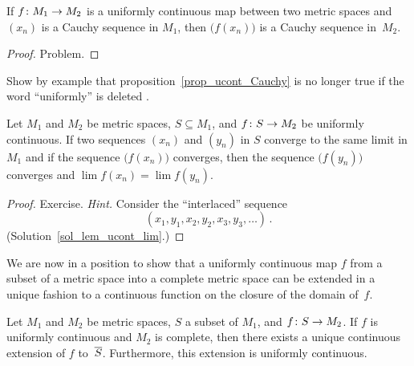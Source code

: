 \begin{prop}\label{prop_ucont_Cauchy}  If $f \colon M_1 \rightarrow M_2$ is a uniformly continuous map
between two metric spaces and $(x_n)$ is a Cauchy sequence in $M_1$, then $\bigl(f(x_n)\bigr)$
is a Cauchy sequence in~$M_2$.
\end{prop}

\begin{proof} Problem.  \ns   \end{proof}

\begin{prob}  Show by example that proposition~\ref{prop_ucont_Cauchy} is no longer true if
the word ``uniformly'' is deleted .
\end{prob}


\begin{lem}\label{lem_ucont_lim}  Let $M_1$ and $M_2$ be metric spaces, $S \subseteq M_1$, and
$f \colon S \rightarrow M_2$ be uniformly continuous.  If two sequences $(x_n)$ and $(y_n)$ in $S$
converge to the same limit in $M_1$ and if the sequence $\bigl(f(x_n)\bigr)$ converges, then
the sequence $\bigl(f(y_n)\bigr)$ converges and $\lim f(x_n) = \lim f(y_n)$.
\end{lem}

\begin{proof}  Exercise.  \emph{Hint.}  Consider the ``interlaced'' sequence
  \[ (x_1, y_1, x_2, y_2, x_3, y_3, \dots )\,. \]
(Solution~\ref{sol_lem_ucont_lim}.) \ns
\end{proof}

We are now in a position to show that a uniformly continuous map $f$ from a subset of a metric
space into a complete metric space can be extended in a unique fashion to a continuous
function on the closure of the domain of~$f$.

\begin{thm}\label{thm_ext_uc}  Let $M_1$ and $M_2$ be metric spaces, $S$ a subset of $M_1$, and
$f \colon S \rightarrow M_2$.  If $f$ is uniformly continuous and $M_2$ is complete, then there
exists a unique continuous extension of $f$ to~$\overline{S}$. Furthermore, this extension is
uniformly continuous.
\end{thm}

